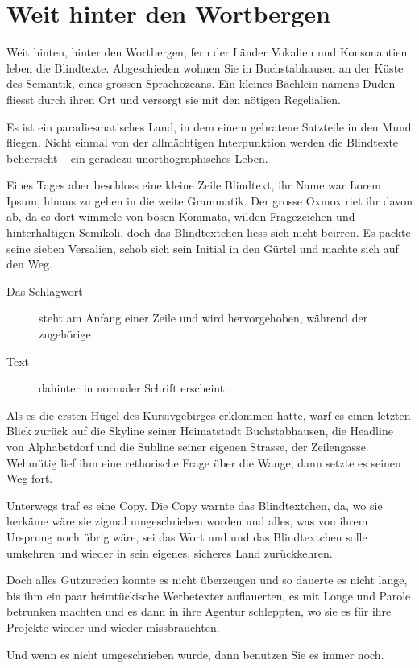 \documentclass{scrartcl}
\begin{document}
  \section{Weit hinter den Wortbergen}

  Weit hinten, hinter den Wortbergen, fern der Länder Vokalien und Konsonantien leben die Blindtexte. Abgeschieden wohnen Sie in Buchstabhausen an der Küste des Semantik, eines grossen Sprachozeans. Ein kleines Bächlein namens Duden fliesst durch ihren Ort und versorgt sie mit den nötigen Regelialien.

  Es ist ein paradiesmatisches Land, in dem einem gebratene Satzteile in den Mund fliegen. Nicht einmal von der allmächtigen Interpunktion werden die Blindtexte beherrscht -- ein geradezu unorthographisches Leben.

  Eines Tages aber beschloss eine kleine Zeile Blindtext, ihr Name war Lorem Ipsum, hinaus zu gehen in die weite Grammatik. Der grosse Oxmox riet ihr davon ab, da es dort wimmele von bösen Kommata, wilden Fragezeichen und hinterhältigen Semikoli, doch das Blindtextchen liess sich nicht beirren. Es packte seine sieben Versalien, schob sich sein Initial in den Gürtel und machte sich auf den Weg.

  \begin{description}
    \item[Das Schlagwort] steht am Anfang einer Zeile und wird hervorgehoben, während der zugehörige
    \item[Text] dahinter in normaler Schrift erscheint.
  \end{description}

  Als es die ersten Hügel des Kursivgebirges erklommen hatte, warf es einen letzten Blick zurück auf die Skyline seiner Heimatstadt Buchstabhausen, die Headline von Alphabetdorf und die Subline seiner eigenen Strasse, der Zeilengasse. Wehmütig lief ihm eine rethorische Frage über die Wange, dann setzte es seinen Weg fort.

  Unterwegs traf es eine Copy. Die Copy warnte das Blindtextchen, da, wo sie herkäme wäre sie zigmal umgeschrieben worden und alles, was von ihrem Ursprung noch übrig wäre, sei das Wort und und das Blindtextchen solle umkehren und wieder in sein eigenes, sicheres Land zurückkehren.

  Doch alles Gutzureden konnte es nicht überzeugen und so dauerte es nicht lange, bis ihm ein paar heimtückische Werbetexter auflauerten, es mit Longe und Parole betrunken machten und es dann in ihre Agentur schleppten, wo sie es für ihre Projekte wieder und wieder missbrauchten.

  Und wenn es nicht umgeschrieben wurde, dann benutzen Sie es immer noch.
\end{document}
